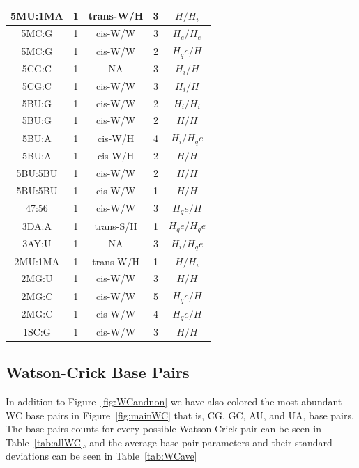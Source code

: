\begin{center}
\begin{longtable}{c|c|c|c|c}
5MU:1MA & 1 & trans-W/H & 3 & $H/H_i$ \\  \hline
5MC:G & 1 & cis-W/W & 3 & $H_e/H_e$ \\  \hline
5MC:G & 1 & cis-W/W & 2 & $H_qe/H$ \\  \hline
5CG:C & 1 & NA & 3 & $H_i/H$ \\  \hline
5CG:C & 1 & cis-W/W & 3 & $H_i/H$ \\  \hline
5BU:G & 1 & cis-W/W & 2 & $H_i/H_i$ \\  \hline
5BU:G & 1 & cis-W/W & 2 & $H/H$ \\  \hline
5BU:A & 1 & cis-W/H & 4 & $H_i/H_qe$ \\  \hline
5BU:A & 1 & cis-W/H & 2 & $H/H$ \\  \hline
5BU:5BU & 1 & cis-W/W & 2 & $H/H$ \\  \hline
5BU:5BU & 1 & cis-W/W & 1 & $H/H$ \\  \hline
47:56 & 1 & cis-W/W & 3 & $H_qe/H$ \\  \hline
3DA:A & 1 & trans-S/H & 1 & $H_qe/H_qe$ \\  \hline
3AY:U & 1 & NA & 3 & $H_i/H_qe$ \\  \hline
2MU:1MA & 1 & trans-W/H & 1 & $H/H_i$ \\  \hline
2MG:U & 1 & cis-W/W & 3 & $H/H$ \\  \hline
2MG:C & 1 & cis-W/W & 5 & $H_qe/H$ \\  \hline
2MG:C & 1 & cis-W/W & 4 & $H_qe/H$ \\  \hline
1SC:G & 1 & cis-W/W & 3 & $H/H$ \\  \hline
\end{longtable}
\end{center}


\subsection{Watson-Crick Base Pairs}

In addition to Figure~\ref{fig:WCandnon} we have also colored the most
abundant WC base pairs  in Figure~\ref{fig:mainWC} that is, CG, GC, AU, and UA, base
pairs. The base pairs counts for every possible Watson-Crick pair can
be seen in Table~\ref{tab:allWC}, and the average base pair parameters
and their standard deviations can be seen in Table~\ref{tab:WCave}

